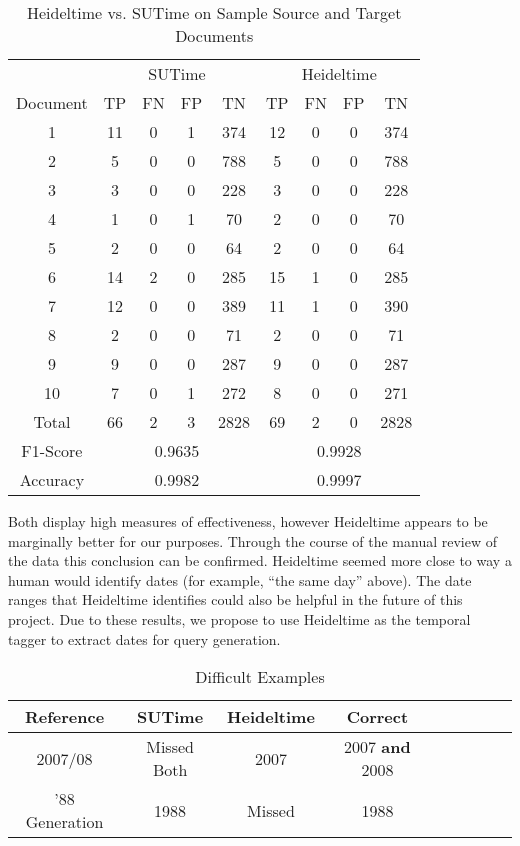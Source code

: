 \documentclass{mprop}
\begin{document}

\begin{table}[H]
\centering
\begin{tabular}{|c|c|c|c|c|c|c|c|c|}
\hline
& \multicolumn{4}{|c|}{SUTime}    & \multicolumn{4}{|c|}{Heideltime} \\ 
\cline{2-9}
Document & TP  & FN & FP & TN     & TP & FN & FP & TN    \\ \hline
1        & 11  & 0  & 1  & 374	  & 12 & 0  & 0  & 374   \\ \hline
2        & 5   & 0  & 0	 & 788 	  & 5  & 0  & 0  & 788   \\ \hline
3		 & 3   & 0  & 0  & 228	  & 3  & 0  & 0  & 228 	 \\ \hline
4        & 1   & 0  & 1	 & 70  	  & 2  & 0  & 0  & 70  	 \\ \hline
5	     & 2   & 0  & 0	 & 64     & 2  & 0  & 0  & 64    \\ \hline
6		 & 14  & 2  & 0	 & 285 	  & 15 & 1  & 0  & 285   \\ \hline
7		 & 12  & 0  & 0	 & 389 	  & 11 & 1  & 0  & 390 	 \\ \hline
8		 & 2   & 0  & 0	 & 71  	  & 2  & 0  & 0  & 71  	 \\ \hline
9		 & 9   & 0  & 0	 & 287 	  & 9  & 0  & 0  & 287 	 \\ \hline
10		 & 7   & 0  & 1	 & 272 	  & 8  & 0  & 0  & 271 	 \\ \hline
Total    & 66  & 2  & 3	 & 2828	  & 69 & 2  & 0  & 2828  \\ \hline
F1-Score & \multicolumn{4}{|c|}{0.9635} & \multicolumn{4}{|c|}{0.9928} \\ \hline
Accuracy & \multicolumn{4}{|c|}{0.9982} & \multicolumn{4}{|c|}{0.9997} \\ \hline
\end{tabular}
\caption{Heideltime vs. SUTime on Sample Source and Target Documents}
\label{temporalcomparison}
\end{table}
Both display high measures of effectiveness, however Heideltime appears to be marginally better for our purposes. 
Through the course of the manual review of the data this conclusion can be confirmed. 
Heideltime seemed more close to way a human would identify dates (for example, ``the same day'' above). 
The date ranges that Heideltime identifies could also be helpful in the future of this project. 
Due to these results, we propose to use Heideltime as the temporal tagger to extract dates for query generation.

\begin{table}[H]
\centering
\begin{tabular}{|c|c|c|c|c|c|c|c|c|}
\hline
Reference      & SUTime          & Heideltime  & Correct                \\ \hline
2007/08		   & Missed Both     & 2007        & 2007 \textbf{and} 2008 \\ \hline
'88 Generation & 1988            & Missed 	   & 1988  	   	            \\ \hline
\end{tabular}
\caption{Difficult Examples}
\label{temporalcomparison}
\end{table}
\end{document}
